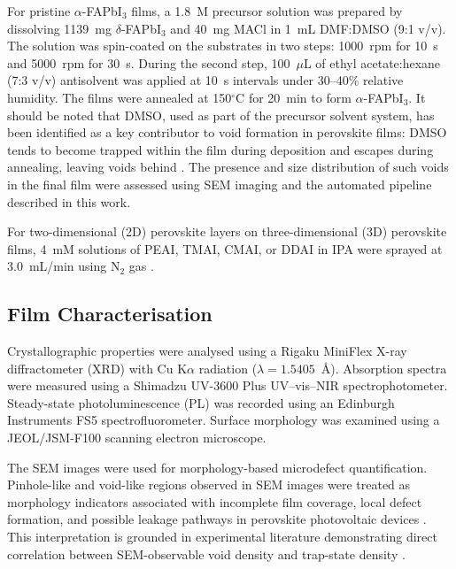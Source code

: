 \documentclass[pdflatex,sn-mathphys-num,iicol]{sn-jnl}
\theoremstyle{thmstyleone}
\theoremstyle{thmstyletwo}
\theoremstyle{thmstylethree}
\begin{document}
For pristine $\alpha$-FAPbI$_3$ films, a 1.8~M precursor solution
was prepared by dissolving 1139~mg $\delta$-FAPbI$_3$ and 40~mg
MACl in 1~mL DMF:DMSO (9:1 v/v). The solution was spin-coated on
the substrates in two steps: 1000~rpm for 10~s and 5000~rpm for 30~s.
During the second step, 100~$\mu$L of ethyl acetate:hexane (7:3 v/v)
antisolvent was applied at 10~s intervals under 30--40\% relative
humidity. The films were annealed at 150$^\circ$C for 20~min to form
$\alpha$-FAPbI$_3$. It should be noted that DMSO, used as part of
the precursor solvent system, has been identified as a key contributor
to void formation in perovskite films: DMSO tends to become trapped
within the film during deposition and escapes during annealing,
leaving voids behind \cite{chang2026,chen2021}. The presence and
size distribution of such voids in the final film were assessed using
SEM imaging and the automated pipeline described in this work.

For two-dimensional (2D) perovskite layers on three-dimensional (3D)
perovskite films, 4~mM solutions of PEAI, TMAI, CMAI, or DDAI in IPA
were sprayed at 3.0~mL/min using N$_2$ gas \cite{ref23}.

\subsection{Film Characterisation}\label{subsec:film_characterization}

Crystallographic properties were analysed using a Rigaku MiniFlex
X-ray diffractometer (XRD) with Cu K$\alpha$ radiation
($\lambda = 1.5405$~\AA). Absorption spectra were measured using a
Shimadzu UV-3600 Plus UV--vis--NIR spectrophotometer. Steady-state
photoluminescence (PL) was recorded using an Edinburgh Instruments
FS5 spectrofluorometer. Surface morphology was examined using a
JEOL/JSM-F100 scanning electron microscope.

The SEM images were used for morphology-based microdefect
quantification. Pinhole-like and void-like regions observed in SEM
images were treated as morphology indicators associated with
incomplete film coverage, local defect formation, and possible
leakage pathways in perovskite photovoltaic devices
\cite{chang2026,hu2023}. This interpretation is grounded in
experimental literature demonstrating direct correlation between
SEM-observable void density and trap-state density
\cite{chang2026}.

\end{document}
